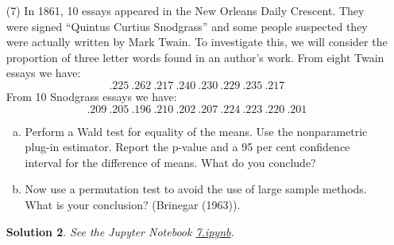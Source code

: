 \documentclass[10pt]{article}
\newtheorem*{sol}{Solution}
\newcommand{\Bern}{\operatorname{Bernoulli}}
\newcommand{\se}{\operatorname{se}}
\begin{document}
\begin{enumerate}
\begin{sol}
Set $n=1919$. Then we have Bernoulli random variables $X_1,\ldots,X_n$
with $X_i=0$ if person $i$ died the week before Passover and $X_i=1$ otherwise.
Let $\theta\in [0,1]$ be the parameter with $X_i\sim \Bern(\theta)$ for each $i$.
So we want to test $H_0:\theta=\theta_0=1/2$ versus $H_1:\theta \neq 1/2$.
We will test this using the Wald test.

Our test statistic is
\[
w = \frac{\hat{\theta} - \theta_0}{\widehat{\se}}.
\]
Our estimate for $\hat{\theta}$ is the mean
\[
\hat{\theta}=\overline{X}=\frac{1}{n}\sum X_i = \frac{997}{1919}\approx 0.5195.
\]
The standard error of $\overline{X}$ is $\sigma/\sqrt{n}$ where $\sigma$
is the standard deviation of the $X_i$. So we estimate $\se$ by
$\widehat{\se}=\widehat{\sigma}/\sqrt{n}$ where $\widehat{\sigma}$ is the
estimated standard deviation of the $X_i$:
\[
\widehat{\se}^2= \frac{1}{n} \hat\theta(1-\hat\theta)
= \frac{1}{1919}\frac{997}{1919}\frac{922}{1919} \approx 0.00013,
\ \ \ \widehat{\se} \approx 0.0114.
\]
Plugging in,
\[
w \approx \frac{0.5195 - 0.5}{0.0114} \approx 1.7105.
\]
By Theorem 10.13, our estimated p-value is
\[
2\Phi(-w)\approx 0.08717.
\]
We can view this as weak evidence against $H_0$ but we don't reject $H_0$
at the size threshold of $0.05$.

A 95\% confidence interval for $\theta$ is given by
\[
(\hat{\theta} - 2 \widehat{\se}, \hat{\theta} - 2\widehat{\se})
= (0.4967, 0.5423).
\]
\end{sol}

\item[(7)] In 1861, 10 essays appeared in the New Orleans Daily Crescent. They
were signed ``Quintus Curtius Snodgrass'' and some people suspected
they were actually written by Mark Twain. To investigate this, we will
consider the proportion of three letter words found in an author's work.
From eight Twain essays we have:
\[
.225 \ .262 \ .217 \ .240 \ .230 \ .229 \ .235 \ .217
\]
From 10 Snodgrass essays we have:
\[
.209 \ .205 \ .196 \ .210 \ .202 \ .207 \ .224 \ .223 \ .220 \ .201
\]
\begin{enumerate}[(a)]
\item Perform a Wald test for equality of the means. Use the nonparametric
plug-in estimator. Report the p-value and a 95 per cent confidence
interval for the difference of means. What do you conclude?
\item Now use a permutation test to avoid the use of large sample methods.
What is your conclusion? (Brinegar (1963)).
\end{enumerate}
\begin{sol}
See the Jupyter Notebook
\href{https://github.com/ajrasmus/some_of_statistics/blob/main/chapter_10/7.ipynb}{7.ipynb}.
\end{sol}


\end{enumerate}
\end{document}
